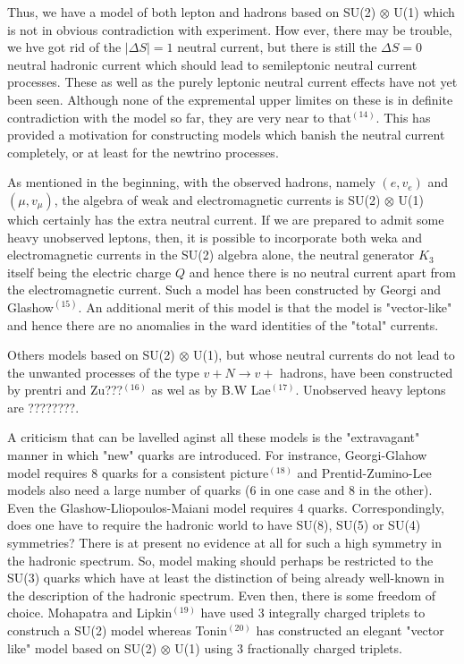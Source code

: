 Thus, we have a model of both lepton and hadrons based on SU(2) $\otimes$ U(1) which is not in obvious contradiction with experiment. How ever, there may be trouble, we hve got rid of the $|\Delta S| = 1$ neutral current, but there is still the $\Delta S  = 0$ neutral hadronic current which should lead to semileptonic neutral current processes. These as well as the purely leptonic neutral current effects have not yet been seen. Although none of the expremental upper limites on these is in definite contradiction with the model so far, they are very near to that$^{(14)}$. This has provided a motivation for constructing models which banish the neutral current completely, or at least for the newtrino processes.

As mentioned in the beginning, with the observed hadrons, namely $(e, v_{e})$ and $(\mu, v_{\mu})$, the algebra of weak and electromagnetic currents is SU(2) $\otimes$ U(1) which certainly has the extra neutral current. If we are prepared to admit some heavy unobserved leptons, then, it is possible to incorporate both weka and electromagnetic currents in the SU(2) algebra alone, the neutral generator $K_{3}$ itself being the electric charge $Q$ and hence there is no neutral current apart from the electromagnetic current. Such a model has been constructed by Georgi and Glashow$^{(15)}$. An additional merit of this model is that the model is "vector-like" and hence there are no anomalies in the ward identities of the "total" currents.

Others models based on SU(2) $\otimes$ U(1), but whose neutral currents do not lead to the unwanted processes of the type $v + N \rightarrow v +$ hadrons, have been constructed by prentri and Zu???$^{(16)}$ as wel as by B.W Lae$^{(17)}$. Unobserved heavy leptons are  ????????.

A criticism that can be lavelled aginst all these models is the "extravagant" manner in which "new" quarks are introduced. For instrance, Georgi-Glahow model requires 8 quarks for a consistent picture$^{(18)}$ and Prentid-Zumino-Lee models also need a large number of quarks (6 in one case and 8 in the other). Even the Glashow-Lliopoulos-Maiani model requires 4 quarks. Correspondingly, does one have to require the hadronic world to have SU(8), SU(5) or SU(4) symmetries? There is at present no evidence at all for such a high symmetry in the hadronic spectrum. So, model making should perhaps be restricted to the SU(3) quarks which have at least the distinction of being already well-known in the description of the hadronic spectrum. Even then, there is some freedom of choice. Mohapatra and Lipkin$^{(19)}$ have used 3 integrally charged triplets to construch a SU(2) model whereas Tonin$^{(20)}$ has constructed an elegant "vector like" model based on SU(2) $\otimes$ U(1) using 3 fractionally charged triplets.

